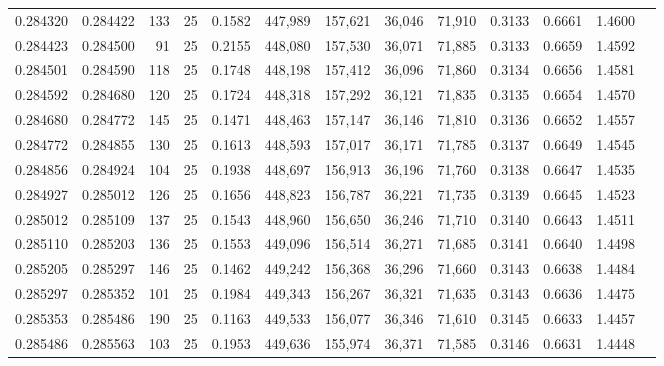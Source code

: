 \begin{tabular}{rrrrrrrrrrrrr}
0.284320 & 0.284422 &   133 &  25 &                                     0.1582 & 447,989 & 157,621 &  36,046 &  71,910 & 0.3133 & 0.6661 & 1.4600 \\
0.284423 & 0.284500 &    91 &  25 &                                     0.2155 & 448,080 & 157,530 &  36,071 &  71,885 & 0.3133 & 0.6659 & 1.4592 \\
0.284501 & 0.284590 &   118 &  25 &                                     0.1748 & 448,198 & 157,412 &  36,096 &  71,860 & 0.3134 & 0.6656 & 1.4581 \\
0.284592 & 0.284680 &   120 &  25 &                                     0.1724 & 448,318 & 157,292 &  36,121 &  71,835 & 0.3135 & 0.6654 & 1.4570 \\
0.284680 & 0.284772 &   145 &  25 &                                     0.1471 & 448,463 & 157,147 &  36,146 &  71,810 & 0.3136 & 0.6652 & 1.4557 \\
0.284772 & 0.284855 &   130 &  25 &                                     0.1613 & 448,593 & 157,017 &  36,171 &  71,785 & 0.3137 & 0.6649 & 1.4545 \\
0.284856 & 0.284924 &   104 &  25 &                                     0.1938 & 448,697 & 156,913 &  36,196 &  71,760 & 0.3138 & 0.6647 & 1.4535 \\
0.284927 & 0.285012 &   126 &  25 &                                     0.1656 & 448,823 & 156,787 &  36,221 &  71,735 & 0.3139 & 0.6645 & 1.4523 \\
0.285012 & 0.285109 &   137 &  25 &                                     0.1543 & 448,960 & 156,650 &  36,246 &  71,710 & 0.3140 & 0.6643 & 1.4511 \\
0.285110 & 0.285203 &   136 &  25 &                                     0.1553 & 449,096 & 156,514 &  36,271 &  71,685 & 0.3141 & 0.6640 & 1.4498 \\
0.285205 & 0.285297 &   146 &  25 &                                     0.1462 & 449,242 & 156,368 &  36,296 &  71,660 & 0.3143 & 0.6638 & 1.4484 \\
0.285297 & 0.285352 &   101 &  25 &                                     0.1984 & 449,343 & 156,267 &  36,321 &  71,635 & 0.3143 & 0.6636 & 1.4475 \\
0.285353 & 0.285486 &   190 &  25 &                                     0.1163 & 449,533 & 156,077 &  36,346 &  71,610 & 0.3145 & 0.6633 & 1.4457 \\
0.285486 & 0.285563 &   103 &  25 &                                     0.1953 & 449,636 & 155,974 &  36,371 &  71,585 & 0.3146 & 0.6631 & 1.4448 \\

\end{tabular}
